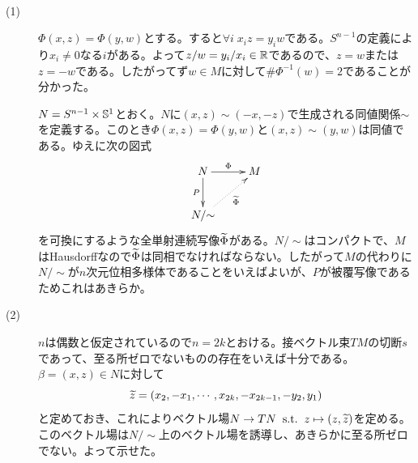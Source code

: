 \newpage


\subsubsection{} %
\begin{sol} ${}$
  \begin{description}
    \item[(1)] $\Phi(x,z) = \Phi(y,w)$とする。すると$\forall i \; x_i z = y_i w$である。$S^{n-1}$の定義により$x_i \neq 0$なる$i$がある。よって$z/w = y_i / x_i \in {\mathbb R}$であるので、$z=w$または$z = -w$である。したがってず$w \in M$に対して$\# \Phi^{-1}(w) =2$であることが分かった。

    $N = S^{n-1} \times {\mathbb S}^1$とおく。$N$に$(x,z) \sim (-x, -z)$で生成される同値関係$\sim$を定義する。このとき$\Phi(x,z) = \Phi(y,w)$と$(x,z) \sim (y,w)$は同値である。ゆえに次の図式
    \[
    \xymatrix{
    N \ar[r]^-{\Phi} \ar[d]_-{P}  & M \\
    N/ {\sim} \ar@{.>}[ru]_-{ \wt{\Phi} }
    }
    \]
    を可換にするような全単射連続写像$\widetilde{\Phi}$がある。$N/{\sim}$はコンパクトで、$M$はHausdorffなので$\widetilde{\Phi}$は同相でなければならない。したがって$M$の代わりに$N/{\sim}$が$n$次元位相多様体であることをいえばよいが、$P$が被覆写像であるためこれはあきらか。
    \item[(2)] $n$は偶数と仮定されているので$n=2k$とおける。接ベクトル束$TM$の切断$s$であって、至る所ゼロでないものの存在をいえば十分である。$\beta = (x,z) \in N$に対して
    \[
    \widetilde{z} = (x_2, -x_1, \cdots , x_{2k}, -x_{2k-1}, -y_2, y_1)
    \]
    と定めておき、これによりベクトル場$N \to TN \; \; \text{s.t.} \; \; z \mapsto (z, \widetilde{z})$を定める。このベクトル場は$N/{\sim}$上のベクトル場を誘導し、あきらかに至る所ゼロでない。よって示せた。
  \end{description}
\end{sol}



\newpage

